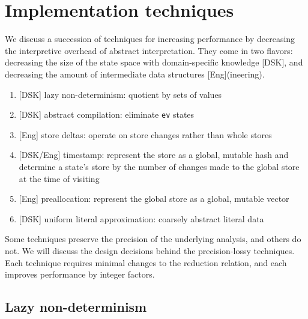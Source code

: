 \documentclass[preprint,onecolumn,9pt]{sigplanconf} %
\begin{document}

\section{Implementation techniques}
\label{sec:opt}

We discuss a succession of techniques for increasing performance by
decreasing the interpretive overhead of abstract interpretation. They
come in two flavors: decreasing the size of the state space with domain-specific knowledge [DSK], and
decreasing the amount of intermediate data structures [Eng](ineering).

\begin{enumerate}
 \item{[DSK] lazy non-determinism: quotient by sets of values}
 \item{[DSK] abstract compilation: eliminate {\tt ev} states}
 \item{[Eng] store deltas: operate on store changes rather than whole stores}
 \item{[DSK/Eng] timestamp: represent the store as a global, mutable
   hash and determine a state's store by the number of changes made to
   the global store at the time of visiting}
 \item{[Eng] preallocation: represent the global store as a global, mutable vector}
 \item{[DSK] uniform literal approximation: coarsely abstract literal data}
\end{enumerate}

Some techniques preserve the precision of the underlying analysis, and
others do not. We will discuss the design decisions behind the
precision-lossy techniques.  Each technique requires minimal changes
to the reduction relation, and each improves performance by
integer factors.

\subsection{Lazy non-determinism}
\end{document}
